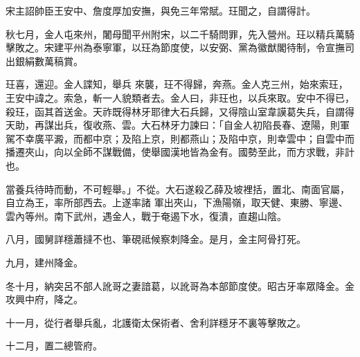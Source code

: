 \begin{pinyinscope}
 宋主詔帥臣王安中、詹度厚加安撫，與免三年常賦。玨聞之，自謂得計。



 秋七月，金人屯來州，闍母聞平州附宋，以二千騎問罪，先入營州。玨以精兵萬騎擊敗之。宋建平州為泰寧軍，以玨為節度使，以安弼、黨為徽猷閣待制，令宣撫司出銀絹數萬稿賞。



 玨喜，還迎。金人諜知，舉兵
 來襲，玨不得歸，奔燕。金人克三州，始來索玨，王安中諱之。索急，斬一人貌類者去。金人曰，非玨也，以兵來取。安中不得已，殺玨，函其首送金。天祚既得林牙耶律大石兵歸，又得陰山室韋謨葛失兵，自謂得天助，再謀出兵，復收燕、雲。大石林牙力諫曰：「自金人初陷長春、遼陽，則軍駕不幸廣平澱，而都中京；及陷上京，則都燕山；及陷中京，則幸雲中；自雲中而播遷夾山，向以全師不謀戰備，使舉國漢地皆為金有。國勢至此，而方求戰，非計也。



 當養兵待時而動，不可輕舉。」不從。大石遂殺乙薛及坡裡括，置北、南面官屬，自立為王，率所部西去。上遂率諸
 軍出夾山，下漁陽嶺，取天健、東勝、寧邊、雲內等州。南下武州，遇金人，戰于奄遏下水，復潰，直趨山陰。



 八月，國舅詳穩蕭撻不也、筆硯祗候察刺降金。是月，金主阿骨打死。



 九月，建州降金。



 冬十月，納突呂不部人訛哥之妻諳葛，以訛哥為本部節度使。昭古牙率眾降金。金攻興中府，降之。



 十一月，從行者舉兵亂，北護衛太保術者、舍利詳穩牙不裏等擊敗之。



 十二月，置二總管府。



\end{pinyinscope}